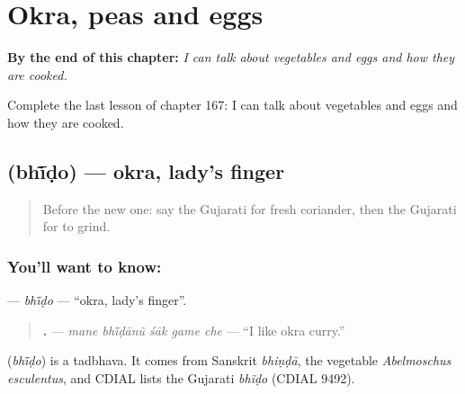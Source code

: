 
\chapter{Okra, peas and eggs}
\label{ch:gu-okra-peas-and-eggs}

\begin{chapteropening}
\textbf{By the end of this chapter:} \emph{I can talk about vegetables and eggs and how they are cooked.}

Complete the last lesson of chapter 167: I can talk about vegetables and eggs and how they are cooked.
\end{chapteropening}

\section[\texorpdfstring{\gu{ભીંડો} (bhī̃ḍo)}{ભીંડો (bhī̃ḍo)}]{ (bhī̃ḍo) — okra, lady's finger}

\label{lesson:GU-C167-bhido}



\begin{quote}
Before the new one: say the Gujarati for fresh coriander, then the Gujarati for to grind.
\end{quote}

\subsection*{You'll want to know: }
\textbf{} — \emph{bhī̃ḍo} — \textquotedblleft{}okra, lady's finger\textquotedblright{}.

\begin{quote}
\textbf{    .} — \emph{mane bhī̃ḍānũ śāk game che} — \textquotedblleft{}I like okra curry.\textquotedblright{}
\end{quote}

\begin{cousinweb}
\textbf{} (\emph{bhī̃ḍo}) is a tadbhava. It comes from Sanskrit \emph{bhiṇḍā}, the vegetable \emph{Abelmoschus esculentus}, and CDIAL lists the Gujarati \emph{bhĩḍo} (CDIAL 9492).
\end{cousinweb}

